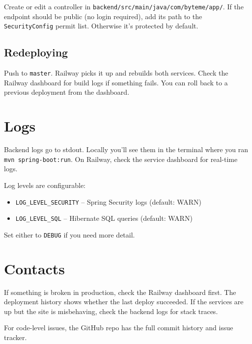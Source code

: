 \documentclass[a4paper,11pt]{article}
\begin{document}
Create or edit a controller in \texttt{backend/src/main/java/com/byteme/app/}. If the endpoint should be public (no login required), add its path to the \texttt{SecurityConfig} permit list. Otherwise it's protected by default.

\subsection{Redeploying}

Push to \texttt{master}. Railway picks it up and rebuilds both services. Check the Railway dashboard for build logs if something fails. You can roll back to a previous deployment from the dashboard.

\section{Logs}

Backend logs go to stdout. Locally you'll see them in the terminal where you ran \texttt{mvn spring-boot:run}. On Railway, check the service dashboard for real-time logs.

Log levels are configurable:

\begin{itemize}
  \item \texttt{LOG\_LEVEL\_SECURITY} -- Spring Security logs (default: WARN)
  \item \texttt{LOG\_LEVEL\_SQL} -- Hibernate SQL queries (default: WARN)
\end{itemize}

Set either to \texttt{DEBUG} if you need more detail.

\section{Contacts}

If something is broken in production, check the Railway dashboard first. The deployment history shows whether the last deploy succeeded. If the services are up but the site is misbehaving, check the backend logs for stack traces.

For code-level issues, the GitHub repo has the full commit history and issue tracker.
\end{document}
